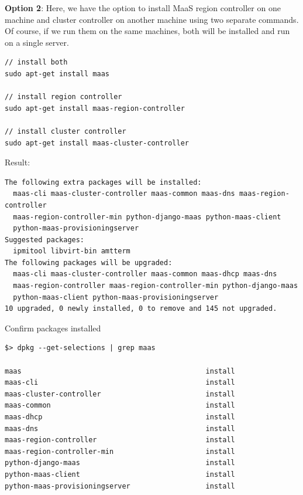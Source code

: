 {\bf Option 2}: Here, we have the option to install MaaS region controller on
one machine and cluster controller on another machine using two separate
commands. Of course, if we run them on the same machines, both will be installed
and run on a single server.
\begin{verbatim}
// install both 
sudo apt-get install maas

// install region controller
sudo apt-get install maas-region-controller

// install cluster controller
sudo apt-get install maas-cluster-controller

\end{verbatim} 

Result:
\begin{verbatim}
The following extra packages will be installed:
  maas-cli maas-cluster-controller maas-common maas-dns maas-region-controller
  maas-region-controller-min python-django-maas python-maas-client
  python-maas-provisioningserver
Suggested packages:
  ipmitool libvirt-bin amtterm
The following packages will be upgraded:
  maas-cli maas-cluster-controller maas-common maas-dhcp maas-dns
  maas-region-controller maas-region-controller-min python-django-maas
  python-maas-client python-maas-provisioningserver
10 upgraded, 0 newly installed, 0 to remove and 145 not upgraded.
\end{verbatim}

Confirm packages installed
\begin{verbatim}
$> dpkg --get-selections | grep maas

maas                                            install
maas-cli                                        install
maas-cluster-controller                         install
maas-common                                     install
maas-dhcp                                       install
maas-dns                                        install
maas-region-controller                          install
maas-region-controller-min                      install
python-django-maas                              install
python-maas-client                              install
python-maas-provisioningserver                  install

\end{verbatim}


